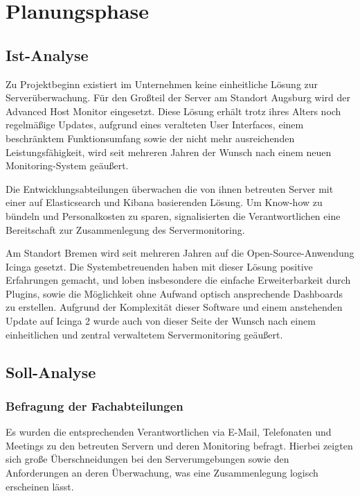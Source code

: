 \section{Planungsphase} 
\label{sec:Planungsphase}

\subsection{Ist-Analyse} 
\label{sec:IstAnalyse}
Zu Projektbeginn existiert im Unternehmen keine einheitliche Lösung zur Serverüberwachung. Für den Großteil der Server am Standort Augsburg wird der \glqq Advanced Host Monitor\grqq{} eingesetzt. Diese Lösung erhält trotz ihres Alters noch regelmäßige Updates, aufgrund eines veralteten User Interfaces, einem beschränktem Funktionsumfang sowie der nicht mehr ausreichenden Leistungsfähigkeit, wird seit mehreren Jahren der Wunsch nach einem neuen Monitoring-System geäußert.

Die Entwicklungsabteilungen überwachen die von ihnen betreuten Server mit einer auf \glqq Elasticsearch\grqq{} und \glqq Kibana\grqq{} basierenden Lösung. Um Know-how zu bündeln und Personalkosten zu sparen, signalisierten die Verantwortlichen eine Bereitschaft zur Zusammenlegung des Servermonitoring.

Am Standort Bremen wird seit mehreren Jahren auf die Open-Source-Anwendung \glqq Icinga\grqq{} gesetzt. Die Systembetreuenden haben mit dieser Lösung positive Erfahrungen gemacht, und loben insbesondere die einfache Erweiterbarkeit durch Plugins, sowie die Möglichkeit ohne Aufwand optisch ansprechende Dashboards zu erstellen. Aufgrund der Komplexität dieser Software und einem anstehenden Update auf \glqq Icinga 2\grqq{} wurde auch von dieser Seite der Wunsch nach einem einheitlichen und zentral verwaltetem Servermonitoring geäußert.

\subsection{Soll-Analyse} 
\label{sec:SollAnalyse}

\subsubsection{Befragung der Fachabteilungen}
\label{sec:BefragungFachabteilungen}
Es wurden die entsprechenden Verantwortlichen via E-Mail, Telefonaten und Meetings zu den betreuten Servern und deren Monitoring befragt. Hierbei zeigten sich große Überschneidungen bei den Serverumgebungen sowie den Anforderungen an deren Überwachung, was eine Zusammenlegung logisch erscheinen lässt.

